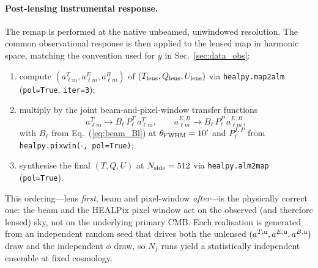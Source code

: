 \documentclass[11pt]{article}
\theoremstyle{definition}
\begin{document}
\paragraph{Post-lensing instrumental response.}
The remap is performed at the native unbeamed, unwindowed resolution. The common observational response is then applied to the lensed map in harmonic space, matching the convention used for $y$ in Sec.~\ref{sec:data_obs}:
\begin{enumerate}[leftmargin=2.0em,itemsep=0.1em]
  \item compute $(a^T_{\ell m},a^E_{\ell m},a^B_{\ell m})$ of $(T_{\rm lens},Q_{\rm lens},U_{\rm lens})$ via \texttt{healpy.map2alm} (\texttt{pol=True}, \texttt{iter=3});
  \item multiply by the joint beam-and-pixel-window transfer functions
  \begin{equation}
    a_{\ell m}^T \!\to\! B_\ell\,P_\ell^{T}\,a_{\ell m}^T,
    \qquad
    a_{\ell m}^{E,B} \!\to\! B_\ell\,P_\ell^{P}\,a_{\ell m}^{E,B},
  \end{equation}
  with $B_\ell$ from Eq.~(\ref{eq:beam_Bl}) at $\theta_{\rm FWHM}=10'$ and $P_\ell^{T,P}$ from \texttt{healpy.pixwin($\cdot$, pol=True)};
  \item synthesise the final $(T,Q,U)$ at $N_{\rm side}=512$ via \texttt{healpy.alm2map} (\texttt{pol=True}).
\end{enumerate}
This ordering---lens \emph{first}, beam and pixel-window \emph{after}---is the physically correct one: the beam and the HEALPix pixel window act on the observed (and therefore lensed) sky, not on the underlying primary CMB. Each realisation is generated from an independent random seed that drives both the unlensed $(a^{T,\rm u},a^{E,\rm u},a^{B,\rm u})$ draw and the independent $\phi$ draw, so $N_f$ runs yield a statistically independent ensemble at fixed cosmology.
\end{document}
